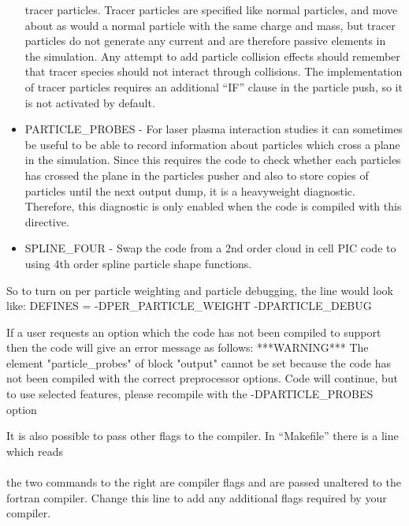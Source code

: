 \documentclass[12pt,a4paper]{article}
\newcommand{\inlinecode}[1]{{\color{warwickred} \bf\texttt{#1}}}
\newenvironment{boxverbatim}{\lboxverbatim{none}}{\endlboxverbatim}
\begin{document}
\begin{itemize}
  tracer particles. Tracer particles are specified like normal particles, and
  move about as would a normal particle with the same charge and mass, but
  tracer particles do not generate any current and are therefore passive
  elements in the simulation. Any attempt to add particle collision effects
  should remember that tracer species should not interact through collisions.
  The implementation of tracer particles requires an additional ``IF'' clause
  in the particle push, so it is not activated by default.
\item PARTICLE\_PROBES - For laser plasma interaction studies it can sometimes
  be useful to be able to record information about particles which cross a
  plane in the simulation. Since this requires the code to check whether each
  particles has crossed the plane in the particles pusher and also to store
  copies of particles until the next output dump, it is a heavyweight
  diagnostic. Therefore, this diagnostic is only enabled when the code is
  compiled with this directive.
\item SPLINE\_FOUR - Swap the code from a 2nd order cloud in cell PIC code to
  using 4th order spline particle shape functions.
\end{itemize}

So to turn on per particle weighting and particle debugging, the line would
look like:
\begin{boxverbatim}
DEFINES = -DPER_PARTICLE_WEIGHT -DPARTICLE_DEBUG
\end{boxverbatim}

If a user requests an option which the code has not been compiled to support
then the code will give an error message as follows:
\begin{boxverbatim}
 ***WARNING***
 The element "particle_probes" of block "output" cannot be set
 because the code has not been compiled with the correct preprocessor options.
 Code will continue, but to use selected features, please recompile with the
 -DPARTICLE_PROBES option
\end{boxverbatim}

It is also possible to pass other flags to the compiler. In ``Makefile'' there
is a line which reads\\
\indent\inlinecode{FFLAGS = -O3 -fast}\\
the two commands to the right are compiler flags and are passed unaltered to
the fortran compiler. Change this line to add any additional flags required by
your compiler.
\end{document}
